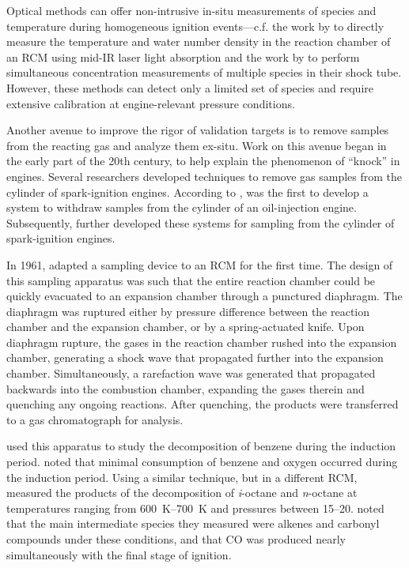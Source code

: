 \documentclass[../main.tex]{subfiles}
\begin{document}
Optical methods can offer non-intrusive in-situ measurements of species
and temperature during homogeneous ignition events---c.f. the work by
\textcite{Das2012, Uddi2012} to directly measure the temperature and
water number density in the reaction chamber of an RCM using mid-IR
laser light absorption and the work by \textcite{Stranic2013} to perform
simultaneous concentration measurements of multiple species in their
shock tube. However, these methods can detect only a limited set of
species and require extensive calibration at engine-relevant pressure
conditions.

Another avenue to improve the rigor of validation targets is to remove
samples from the reacting gas and analyze them ex-situ. Work on this
avenue began in the early part of the 20th century, to help explain the
phenomenon of ``knock'' in engines. Several researchers developed
techniques to remove gas samples from the cylinder of spark-ignition
engines. According to \textcite{Withrow1930}, \textcite{Brooks1922} was
the first to develop a system to withdraw samples from the cylinder of
an oil-injection engine. Subsequently, \textcite{Callendar1926,
Egerton1926, Lovell1927, Ricardo1928, Withrow1930, Steele1933, Egerton1935,
Downs1951, Pahnke1954} further developed these systems for sampling from
the cylinder of spark-ignition engines.

In 1961, \textcite{Roblee1961} adapted a sampling device to an RCM for
the first time. The design of this sampling apparatus was such that the
entire reaction chamber could be quickly evacuated to an expansion chamber
through a punctured diaphragm. The diaphragm was ruptured either by
pressure difference between the reaction chamber and the expansion
chamber, or by a spring-actuated knife. Upon diaphragm rupture, the
gases in the reaction chamber rushed into the expansion chamber,
generating a shock wave that propagated further into the expansion
chamber. Simultaneously, a rarefaction wave was generated that
propagated backwards into the combustion chamber, expanding the gases
therein and quenching any ongoing reactions. After quenching, the
products were transferred to a gas chromatograph for analysis.

\textcite{Roblee1961} used this apparatus to study the decomposition of
benzene during the induction period. \textcite{Roblee1961} noted that minimal
consumption of benzene and oxygen occurred during the induction period.
Using a similar technique, but in a different RCM, \textcite{Martinengo1965}
measured the products of the decomposition of \textit{i}-octane and
\textit{n}-octane at temperatures ranging from \SIrange{600}{700}{\kelvin}
and pressures between \SIrange{15}{20}{\atmosphere}. \textcite{Martinengo1965}
noted that the main intermediate species they measured were alkenes and carbonyl
compounds under these conditions, and that CO was produced nearly simultaneously
with the final stage of ignition.
\end{document}
